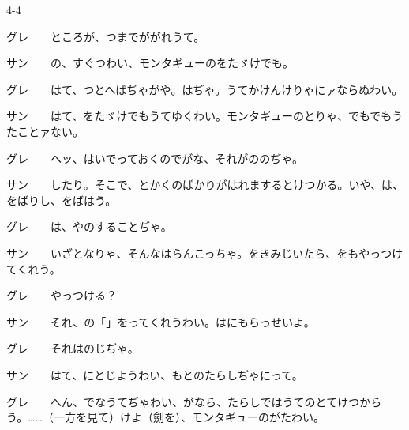 \documentclass[tate,paper=b6j,jafontsize=9pt]{jlreq}
\begin{document}
\begin{azconvIndented}{4\zw}{-4\zw}

グレ　　ところが、つまでががれうて。

サン　　の、すぐつわい、モンタギューのをたゞけでも。

グレ　　はて、つとへばぢゃがや。はぢゃ。うてかけんけりゃにァならぬわい。

サン　　はて、をたゞけでもうてゆくわい。モンタギューのとりゃ、でもでもうたことァない。

グレ　　へッ、はいでっておくのでがな、それがののぢゃ。

サン　　したり。そこで、とかくのばかりがはれまするとけつかる。いや、は、をばりし、をばはう。

グレ　　は、やのすることぢゃ。

サン　　いざとなりゃ、そんなはらんこっちゃ。をきみじいたら、をもやっつけてくれう。

グレ　　やっつける？

サン　　それ、の「」をってくれうわい。はにもらっせいよ。

グレ　　それはのじぢゃ。

サン　　はて、にとじようわい、もとのたらしぢゃにって。

グレ　　へん、でなうてぢゃわい、がなら、たらしではうてのとてけつからう。……（一方を見て）けよ（劍を）、モンタギューのがたわい。

\end{azconvIndented}
\end{document}
